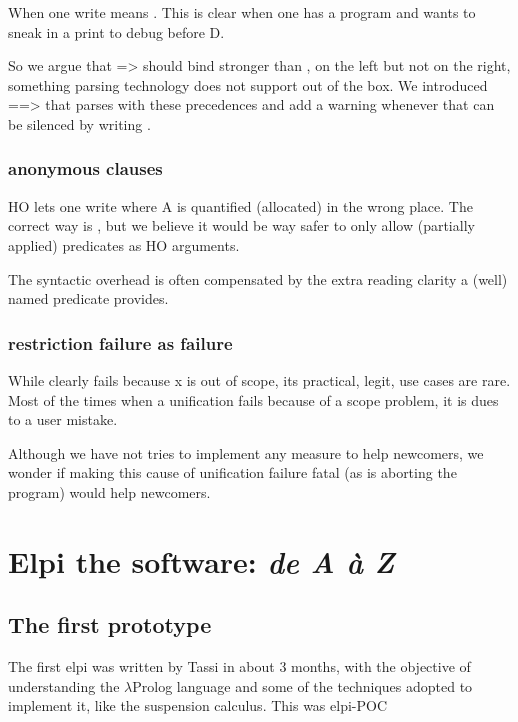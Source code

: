\documentclass[a4paper, 11pt]{book}
\begin{document}
When one write  means
. This is clear when
one has a program  and wants
to sneak in a print to debug before D.

So we argue that => should bind stronger than ,
on the left but not on the right, something parsing
technology does not support out of the box. We introduced
==> that parses with these precedences and add a warning
whenever  that can be silenced
by writing .

\subsection{anonymous clauses}

HO lets one write 
where A is quantified (allocated) in the wrong place.
The correct way is ,
but we believe it would be way safer to only allow (partially
applied) predicates as HO arguments.

The syntactic overhead is often compensated by the extra
reading clarity a (well) named predicate provides.

\subsection{restriction failure as failure}

While  clearly fails because x is
out of scope, its practical, legit, use cases are rare.
Most of the times when a unification fails because of
a scope problem, it is dues to a user mistake.

Although we have not tries to implement any measure to help
newcomers, we wonder if making this cause of unification failure
fatal (as is aborting the program) would help newcomers.


\chapter{Elpi the software: \emph{de A \`a Z}}

\section{The first prototype}

The first elpi was written by Tassi in about 3 months, with the objective
of understanding the $\lambda$Prolog language and some of the techniques
adopted to implement it, like the suspension calculus. This was elpi-POC
\end{document}
